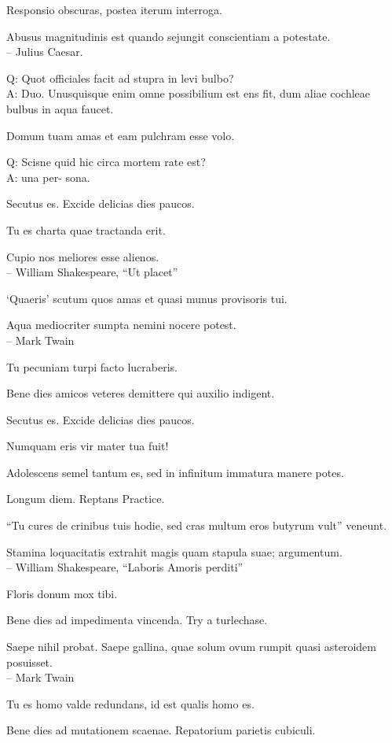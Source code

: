 \documentclass[titlepage,12pt]{memoir}
\begin{document}
Responsio obscuras, postea iterum interroga.

Abusus magnitudinis est quando sejungit conscientiam a potestate.
\\-- Julius Caesar.

Q: Quot officiales facit ad stupra in levi bulbo?\\
A: Duo. Unusquisque enim omne possibilium est ens
fit, dum aliae cochleae bulbus in aqua faucet.

Domum tuam amas et eam pulchram esse volo.

Q: Scisne quid hic circa mortem rate est?\\
A: una per- sona.

Secutus es. Excide delicias dies paucos.

Tu es charta quae tractanda erit.

 Cupio nos meliores esse alienos.
\\-- William Shakespeare, “Ut placet”

‘Quaeris’ scutum quos amas et quasi munus provisoris tui.

Aqua mediocriter sumpta nemini nocere potest.
\\-- Mark Twain

Tu pecuniam turpi facto lucraberis.

Bene dies amicos veteres demittere qui auxilio indigent.

Secutus es. Excide delicias dies paucos.

Numquam eris vir mater tua fuit!

Adolescens semel tantum es, sed in infinitum immatura manere potes.

Longum diem. Reptans Practice.

“Tu cures de crinibus tuis hodie, sed cras multum eros butyrum vult”
veneunt.

Stamina loquacitatis extrahit magis quam stapula suae;
argumentum.
\\-- William Shakespeare, “Laboris Amoris perditi”

Floris donum mox tibi.

Bene dies ad impedimenta vincenda. Try a turlechase.

Saepe nihil probat. Saepe gallina, quae solum ovum rumpit
quasi asteroidem posuisset.
\\-- Mark Twain

Tu es homo valde redundans, id est qualis homo es.

Bene dies ad mutationem scaenae. Repatorium parietis cubiculi.
\end{document}
